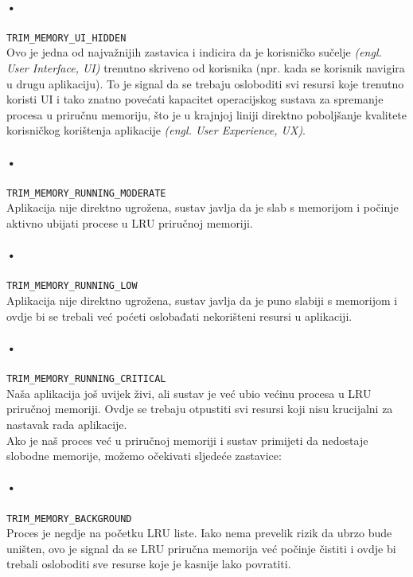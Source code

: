 \documentclass[times, utf8, zavrsni]{fer}
\begin{document}
\paragraph{•}
\verb|TRIM_MEMORY_UI_HIDDEN|\\
Ovo je jedna od najvažnijih zastavica i indicira da je korisničko sučelje \textit{(engl. User Interface, UI)} trenutno skriveno od korisnika (npr. kada se korisnik navigira u drugu aplikaciju). To je signal da se trebaju osloboditi svi resursi koje trenutno koristi UI i tako znatno povećati kapacitet operacijskog sustava za spremanje procesa u priručnu memoriju, što je u krajnjoj liniji direktno poboljšanje kvalitete korisničkog korištenja aplikacije \textit{(engl. User Experience, UX)}.

\paragraph{•}
\verb|TRIM_MEMORY_RUNNING_MODERATE|\\
Aplikacija nije direktno ugrožena, sustav javlja da je slab s memorijom i počinje aktivno ubijati procese u LRU priručnoj memoriji.

\paragraph{•}
\verb|TRIM_MEMORY_RUNNING_LOW|\\
Aplikacija nije direktno ugrožena, sustav javlja da je puno slabiji s memorijom i ovdje bi se trebali već poćeti oslobađati nekorišteni resursi u aplikaciji.

\paragraph{•}
\verb|TRIM_MEMORY_RUNNING_CRITICAL|\\
Naša aplikacija još uvijek živi, ali sustav je već ubio većinu procesa u LRU priručnoj memoriji. Ovdje se trebaju otpustiti svi resursi koji nisu krucijalni za nastavak rada aplikacije.\\

\noindent
Ako je naš proces već u priručnoj memoriji i sustav primijeti da nedostaje slobodne memorije, možemo očekivati sljedeće zastavice:

\paragraph{•}
\verb|TRIM_MEMORY_BACKGROUND|\\
Proces je negdje na početku LRU liste. Iako nema prevelik rizik da ubrzo bude uništen, ovo je signal da se LRU priručna memorija već počinje čistiti i ovdje bi trebali osloboditi sve resurse koje je kasnije lako povratiti.
\end{document}
